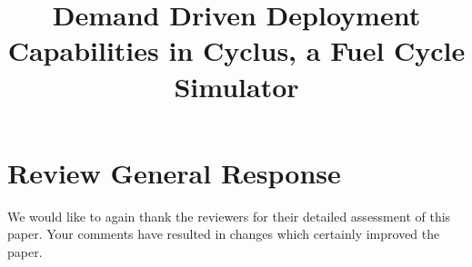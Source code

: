 \documentclass[answers,11pt]{exam}
\begin{document}



\title{Demand Driven Deployment Capabilities in Cyclus, a Fuel Cycle Simulator}



%

\section*{Review General Response}
We would like to again thank the reviewers for their detailed assessment of
this paper. Your comments have resulted in changes which certainly improved the 
paper.
\end{document}
